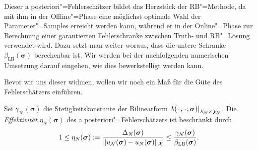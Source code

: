 \documentclass[../main.tex]{subfiles}
\begin{document}
Dieser a posteriori"=Fehlerschätzer bildet das Herzstück der RB"=Methode, da mit ihm in der Offline"=Phase eine möglichst optimale Wahl der Parameter"=Samples erreicht werden kann, während er in der Online"=Phase zur Berechnung einer garantierten Fehlerschranke zwischen Truth- und RB"=Lösung verwendet wird.
Dazu setzt man weiter woraus, dass die untere Schranke $\beta_{\mathrm{LB}}(\bm \sigma)$ berechenbar ist.
Wir werden bei der nachfolgenden numerischen Umsetzung darauf eingehen, wie dies bewerkstelligt werden kann.

Bevor wir uns dieser widmen, wollen wir noch ein Maß für die Güte des Fehlerschätzers einführen.

\begin{Lemma}
\label{lemma:effektivitaet}
    Sei $\gamma_{\mathcal N}(\bm \sigma)$ die Stetigkeitskonstante der Bilinearform $\left.b({\mkern2mu\cdot\mkern2mu}, {\mkern2mu\cdot\mkern2mu}; \bm \sigma)\right|_{\mathcal X_{\mathcal N} \times \mathcal Y_{\mathcal N}}$.
    Die \emph{Effektivität} $\eta_{N}(\bm \sigma)$ des a posteriori"=Fehlerschätzers ist beschränkt durch
    \begin{equation}
        1 \leq \eta_{N}(\bm \sigma) := \frac{\Delta_{N}(\bm \sigma)}{\lVert u_{\mathcal N}(\bm \sigma) - u_{N}(\bm \sigma)\rVert_{\mathcal X}} \leq \frac{\gamma_{\mathcal N}(\bm \sigma)}{\beta_{\mathrm{LB}}(\bm \sigma)}.
    \end{equation}


\end{Lemma}
\end{document}
